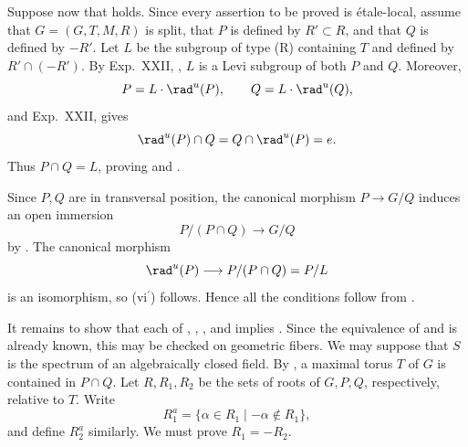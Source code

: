 Suppose now that \textup{} holds.  Since every assertion to be
proved is étale-local, assume that \(G=(G,T,M,R)\) is split, that \(P\)
is defined by \(R'\subset R\), and that \(Q\) is defined by \(-R'\).
Let \(L\) be the subgroup of type \textup{(R)} containing \(T\) and
defined by \(R'\cap(-R')\).  By Exp.\ XXII, , \(L\) is a Levi
subgroup of both \(P\) and \(Q\).  Moreover,
\[
 P=L\cdot\rad^u(P),\qquad Q=L\cdot\rad^u(Q),
\]
and Exp.\ XXII,  gives
\[
 \rad^u(P)\cap Q=Q\cap\rad^u(P)=e.
\]
Thus \(P\cap Q=L\), proving \textup{} and \textup{}.

Since \(P,Q\) are in transversal position, the canonical morphism
\(P\to G/Q\) induces an open immersion
\[
 P/(P\cap Q)\longrightarrow G/Q
\]
by .  The canonical morphism
\[
 \rad^u(P)\longrightarrow P/(P\cap Q)=P/L
\]
is an isomorphism, so \textup{(vi\(^{\prime}\))} follows.  Hence all
the conditions follow from \textup{}.

It remains to show that each of \textup{}, \textup{},
\textup{}, and \textup{} implies \textup{}.  Since the
equivalence of \textup{} and \textup{} is already known, this
may be checked on geometric fibers.  We may suppose that \(S\) is the
spectrum of an algebraically closed field.  By , a maximal torus
\(T\) of \(G\) is contained in \(P\cap Q\).  Let \(R,R_1,R_2\) be the
sets of roots of \(G,P,Q\), respectively, relative to \(T\).  Write
\[
 R_1^a=\{\alpha\in R_1\mid-\alpha\notin R_1\},
\]
and define \(R_2^a\) similarly.  We must prove \(R_1=-R_2\).

